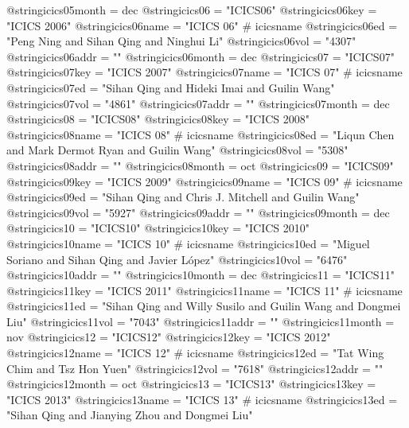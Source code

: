 @string{icics05month =          dec}
@string{icics06 =               "ICICS06"}
@string{icics06key =            "ICICS 2006"}
@string{icics06name =           "ICICS 06" # icicsname}
@string{icics06ed =             "Peng Ning and Sihan Qing and Ninghui Li"}
@string{icics06vol =            "4307"}
@string{icics06addr =           ""}
@string{icics06month =          dec}
@string{icics07 =               "ICICS07"}
@string{icics07key =            "ICICS 2007"}
@string{icics07name =           "ICICS 07" # icicsname}
@string{icics07ed =             "Sihan Qing and Hideki Imai and Guilin Wang"}
@string{icics07vol =            "4861"}
@string{icics07addr =           ""}
@string{icics07month =          dec}
@string{icics08 =               "ICICS08"}
@string{icics08key =            "ICICS 2008"}
@string{icics08name =           "ICICS 08" # icicsname}
@string{icics08ed =             "Liqun Chen and Mark Dermot Ryan and Guilin Wang"}
@string{icics08vol =            "5308"}
@string{icics08addr =           ""}
@string{icics08month =          oct}
@string{icics09 =               "ICICS09"}
@string{icics09key =            "ICICS 2009"}
@string{icics09name =           "ICICS 09" # icicsname}
@string{icics09ed =             "Sihan Qing and Chris J. Mitchell and Guilin Wang"}
@string{icics09vol =            "5927"}
@string{icics09addr =           ""}
@string{icics09month =          dec}
@string{icics10 =               "ICICS10"}
@string{icics10key =            "ICICS 2010"}
@string{icics10name =           "ICICS 10" # icicsname}
@string{icics10ed =             "Miguel Soriano and Sihan Qing and Javier L{\'o}pez"}
@string{icics10vol =            "6476"}
@string{icics10addr =           ""}
@string{icics10month =          dec}
@string{icics11 =               "ICICS11"}
@string{icics11key =            "ICICS 2011"}
@string{icics11name =           "ICICS 11" # icicsname}
@string{icics11ed =             "Sihan Qing and Willy Susilo and Guilin Wang and Dongmei Liu"}
@string{icics11vol =            "7043"}
@string{icics11addr =           ""}
@string{icics11month =          nov}
@string{icics12 =               "ICICS12"}
@string{icics12key =            "ICICS 2012"}
@string{icics12name =           "ICICS 12" # icicsname}
@string{icics12ed =             "Tat Wing Chim and Tsz Hon Yuen"}
@string{icics12vol =            "7618"}
@string{icics12addr =           ""}
@string{icics12month =          oct}
@string{icics13 =               "ICICS13"}
@string{icics13key =            "ICICS 2013"}
@string{icics13name =           "ICICS 13" # icicsname}
@string{icics13ed =             "Sihan Qing and Jianying Zhou and Dongmei Liu"}
